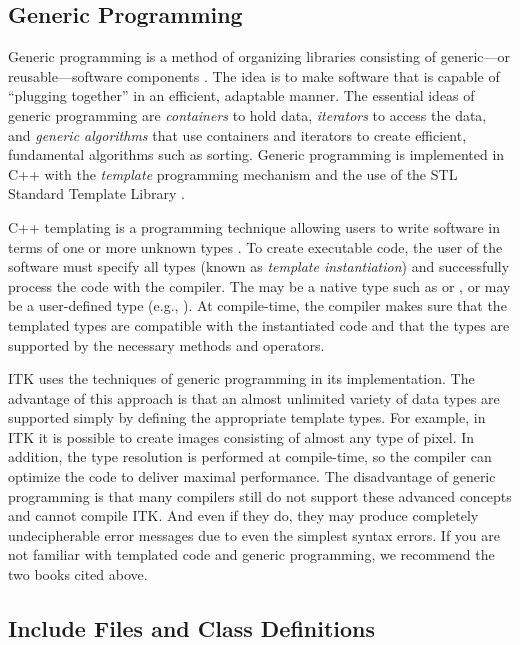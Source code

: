 \subsection{Generic Programming}
\label{sec:GenericProgramming}


Generic programming is a method of organizing libraries consisting of
generic---or reusable---software components \cite{Musser1996}. The idea is to
make software that is capable of ``plugging together'' in an efficient,
adaptable manner. The essential ideas of generic programming are
\emph{containers} to hold data, \emph{iterators} to access the data, and 
\emph{generic algorithms} that use containers and iterators to create 
efficient, fundamental algorithms such as sorting. Generic programming is
implemented in C++ with the \emph{template} programming mechanism and the 
use of the STL Standard Template Library \cite{Austern1999}.

C++ templating is a programming technique allowing users to write software in
terms of one or more unknown types . To create executable code, the
user of the software must specify all types  (known as \emph{template
instantiation}) and successfully process the code with the compiler. The
 may be a native type such as
 or , or  may be a user-defined type (e.g.,
). At compile-time, the compiler makes sure that the templated 
types are compatible with the instantiated code and that the types are
supported by the necessary methods and operators.

ITK uses the techniques of generic programming in its implementation. The
advantage of this approach is that an almost unlimited variety of data types
are supported simply by defining the appropriate template types. For example,
in ITK it is possible to create images consisting of almost any type of
pixel. In addition, the type resolution is performed at compile-time, so the
compiler can optimize the code to deliver maximal performance. The
disadvantage of generic programming is that many compilers still do not
support these advanced concepts and cannot compile ITK. And even if they do,
they may produce completely undecipherable error messages due to even the
simplest syntax errors. If you are not familiar with templated code and
generic programming, we recommend the two books cited above.

\subsection{Include Files and Class Definitions}
\label{sec:IncludeFiles}

